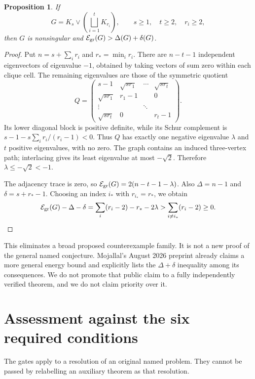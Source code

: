 \documentclass[11pt,a4paper]{article}
\newtheorem{proposition}[theorem]{Proposition}
\theoremstyle{definition}
\theoremstyle{remark}\newtheorem{remark}[theorem]{Remark}
\begin{document}
\begin{proposition}\label{prop:energy}
If
\[
 G=K_s\vee\left(\bigsqcup_{i=1}^tK_{r_i}\right),\qquad
 s\ge1,\quad t\ge2,\quad r_i\ge2,
\]
then $G$ is nonsingular and
$\mathcal{E}_{\rm gr}(G)>\Delta(G)+\delta(G)$.
\end{proposition}
\begin{proof}
Put $n=s+\sum_i r_i$ and $r_* =\min_i r_i$.
There are $n-t-1$ independent eigenvectors of eigenvalue $-1$,
obtained by taking vectors of sum zero within each clique cell.
The remaining eigenvalues are those of the symmetric quotient
\[
 Q=\begin{pmatrix}
 s-1&\sqrt{sr_1}&\cdots&\sqrt{sr_t}\\
 \sqrt{sr_1}&r_1-1&&0\\
 \vdots&&\ddots&\\
 \sqrt{sr_t}&0&&r_t-1
 \end{pmatrix}.
\]
Its lower diagonal block is positive definite, while its Schur
complement is
$s-1-s\sum_i r_i/(r_i-1)<0$. Thus $Q$ has exactly one negative
eigenvalue $\lambda$ and $t$ positive eigenvalues, with no zero.
The graph contains an induced three-vertex path; interlacing
gives its least eigenvalue at most $-\sqrt2$. Therefore
$\lambda\le-\sqrt2<-1$.

The adjacency trace is zero, so
$\mathcal{E}_{\rm gr}(G)=2(n-t-1-\lambda)$.
Also $\Delta=n-1$ and $\delta=s+r_*-1$. Choosing an index $i_*$
with $r_{i_*}=r_*$, we obtain
\[
 \mathcal{E}_{\rm gr}(G)-\Delta-\delta
 =\sum_i(r_i-2)-r_*-2\lambda
 >\sum_{i\ne i_*}(r_i-2)\ge0.
\]
\end{proof}

This eliminates a broad proposed counterexample family. It is not
a new proof of the general named conjecture. Mojallal's August
2026 preprint \cite{Mojallal} already claims a more general energy
bound and explicitly lists the $\Delta+\delta$ inequality among
its consequences. We do not promote that public claim to a
fully independently verified theorem, and we do not claim priority
over it.

\section{Assessment against the six required conditions}
\label{sec:gates}

The gates apply to a resolution of an original named problem.
They cannot be passed by relabelling an auxiliary theorem as that
resolution.
\end{document}
